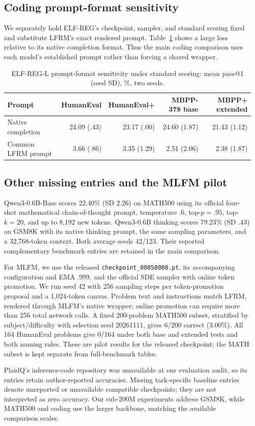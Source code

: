 \documentclass{article}
\newenvironment{revision}{\begingroup\color{blue}}{\endgroup}
\begin{document}
\begin{revision}
\subsection{Coding prompt-format sensitivity}
We separately hold ELF-REG's checkpoint, sampler, and standard scoring fixed and substitute LFRM's exact rendered prompt. Table~\ref{tab:codepromptmatch} shows a large loss relative to its native completion format. Thus the main coding comparison uses each model's established prompt rather than forcing a shared wrapper.
\begin{table}[htbp]\color{blue}\centering\small
\caption{ELF-REG-L prompt-format sensitivity under standard scoring: mean pass@1 (seed SD), \%, two seeds.}
\label{tab:codepromptmatch}
\begin{tabular}{@{}lrrrr@{}}\toprule
Prompt & HumanEval & HumanEval+ & MBPP-378 base & MBPP+ extended\\\midrule
Native completion & 24.09 (.43) & 23.17 (.00) & 24.60 (1.87) & 21.43 (1.12)\\
Common LFRM prompt & 3.66 (.86) & 3.35 (1.29) & 2.51 (2.06) & 2.38 (1.87)\\\bottomrule
\end{tabular}
\end{table}

\subsection{Other missing entries and the MLFM pilot}
Qwen3-0.6B-Base scores 22.40\% (SD 2.26) on MATH500 using its official four-shot mathematical chain-of-thought prompt, temperature $.6$, top-$p=.95$, top-$k=20$, and up to 8,192 new tokens. Qwen3-0.6B thinking scores 79.23\% (SD $.43$) on GSM8K with its native thinking prompt, the same sampling parameters, and a 32,768-token context. Both average seeds 42/123. Their reported complementary benchmark entries are retained in the main comparison.

For MLFM, we use the released \texttt{checkpoint\_00050000.pt}, its accompanying configuration and EMA $.999$, and the official SDE sampler with online token promotion. We run seed 42 with 256 sampling steps per token-promotion proposal and a 1,024-token canvas. Problem text and instructions match LFRM, rendered through MLFM's native wrapper; online promotion can require more than 256 total network calls. A fixed 200-problem MATH500 subset, stratified by subject/difficulty with selection seed 20261111, gives 6/200 correct (3.00\%). All 164 HumanEval problems give 0/164 under both base and extended tests and both naming rules. These are pilot results for the released checkpoint; the MATH subset is kept separate from full-benchmark tables.

PlaidQ's inference-code repository was unavailable at our evaluation audit, so its entries retain author-reported accuracies. Missing task-specific baseline entries denote unreported or unavailable compatible checkpoints; they are not interpreted as zero accuracy. Our sub-200M experiments address GSM8K, while MATH500 and coding use the larger backbone, matching the available comparison scales.
\end{revision}
\end{document}
